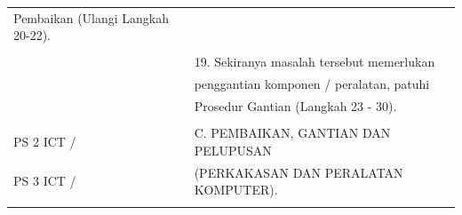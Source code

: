 \documentclass[
]{article}
\begin{document}
\begin{longtable}[]{@{}ll@{}}
\begin{minipage}[t]{0.71\columnwidth}
Pembaikan (Ulangi Langkah 20-22).\strut
\end{minipage}\tabularnewline
\begin{minipage}[t]{0.23\columnwidth}\raggedright
\strut
\end{minipage} & \begin{minipage}[t]{0.71\columnwidth}\raggedright
\strut
\end{minipage}\tabularnewline
\begin{minipage}[t]{0.23\columnwidth}\raggedright
\strut
\end{minipage} & \begin{minipage}[t]{0.71\columnwidth}\raggedright
19. Sekiranya masalah tersebut memerlukan\strut
\end{minipage}\tabularnewline
\begin{minipage}[t]{0.23\columnwidth}\raggedright
\strut
\end{minipage} & \begin{minipage}[t]{0.71\columnwidth}\raggedright
penggantian komponen / peralatan, patuhi\strut
\end{minipage}\tabularnewline
\begin{minipage}[t]{0.23\columnwidth}\raggedright
\strut
\end{minipage} & \begin{minipage}[t]{0.71\columnwidth}\raggedright
Prosedur Gantian (Langkah 23 - 30).\strut
\end{minipage}\tabularnewline
\begin{minipage}[t]{0.23\columnwidth}\raggedright
\strut
\end{minipage} & \begin{minipage}[t]{0.71\columnwidth}\raggedright
\strut
\end{minipage}\tabularnewline
\begin{minipage}[t]{0.23\columnwidth}\raggedright
PS 2 ICT /\strut
\end{minipage} & \begin{minipage}[t]{0.71\columnwidth}\raggedright
C. PEMBAIKAN, GANTIAN DAN PELUPUSAN\strut
\end{minipage}\tabularnewline
\begin{minipage}[t]{0.23\columnwidth}\raggedright
PS 3 ICT /\strut
\end{minipage} & \begin{minipage}[t]{0.71\columnwidth}\raggedright
(PERKAKASAN DAN PERALATAN KOMPUTER).\strut
\end{minipage}\tabularnewline
\begin{minipage}[t]{0.23\columnwidth}\raggedright

\end{minipage}
\end{longtable}
\end{document}
